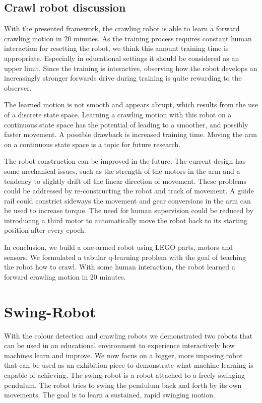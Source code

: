 \documentclass[11pt, a4paper]{article}
\begin{document}
	
	\subsection{Crawl robot discussion}
	With the presented framework, the crawling robot is able to learn a forward crawling motion in 20 minutes. As the training process requires constant human interaction for resetting the robot, we think this amount training time is appropriate. Especially in educational settings it should be considered as an upper limit. Since the training is interactive, observing how the robot develops an increasingly stronger forwards drive during training is quite rewarding to the observer. 
	
	The learned motion is not smooth and appears abrupt, which results from the use of a discrete state space. Learning a crawling motion with this robot on a continuous state space has the potential of leading to a smoother, and possibly faster movement. A possible drawback is increased training time. Moving the arm on a continuous state space is a topic for future research.
	
	The robot construction can be improved in the future. The current design has some mechanical issues, such as the strength of the motors in the arm and a tendency to slightly drift off the linear direction of movement. These problems could be addressed by re-constructing the robot and track of movement. A guide rail could constrict sideways the movement and gear conversions in the arm can be used to increase torque. The need for human supervision could be reduced by introducing a third motor to automatically move the robot back to its starting position after every epoch.
	
	\medskip
	In conclusion, we build a one-armed robot using LEGO parts, motors and sensors. We formulated a tabular q-learning problem with the goal of teaching the robot how to crawl. With some human interaction, the robot learned a forward crawling motion in 20 minutes.
	
	
	
	
	\pagebreak
	\section{Swing-Robot}
	With the colour detection and crawling robots we demonstrated two robots that can be used in an educational environment to experience interactively how machines learn and improve. We now focus on a bigger, more imposing robot that can be used as an exhibition piece to demonstrate what machine learning is capable of achieving. The swing-robot is a robot attached to a freely swinging pendulum. The robot tries to swing the pendulum back and forth by its own movements. The goal is to learn a sustained, rapid swinging motion. 
	
\end{document}
